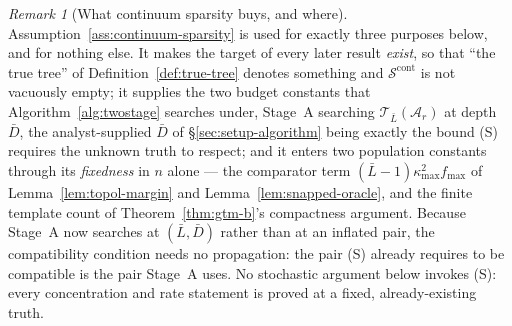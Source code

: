 \documentclass[11pt]{article}
\theoremstyle{plain}
\theoremstyle{definition}
\theoremstyle{remark}
\newtheorem{remark}[theorem]{Remark}
\newcommand{\cA}{\mathcal{A}}
\newcommand{\cT}{\mathcal{T}}
\newcommand{\cS}{\mathcal{S}}
\begin{document}
\begin{remark}[What continuum sparsity buys, and where]
\label{rem:sparsity-role}
Assumption~\ref{ass:continuum-sparsity} is used for exactly three purposes
below, and for nothing else. It makes the target of every later result
\emph{exist}, so that ``the true tree'' of Definition~\ref{def:true-tree}
denotes something and \(\cS^{\mathrm{cont}}\) is not vacuously empty; it
supplies the two budget constants that Algorithm~\ref{alg:twostage} searches
under, Stage~A searching \(\cT_{\bar L}(\cA_r)\) at depth \(\bar D\), the
analyst-supplied \(\bar D\) of \S\ref{sec:setup-algorithm} being exactly the
bound (S) requires the unknown truth to respect; and it enters two population
constants through its \emph{fixedness} in \(n\) alone --- the comparator term
\((\bar L-1)\kappa_{\max}^2f_{\max}\) of Lemma~\ref{lem:topol-margin} and
Lemma~\ref{lem:snapped-oracle}, and the finite template count of
Theorem~\ref{thm:gtm-b}'s compactness argument. Because Stage~A now searches
at \((\bar L,\bar D)\) rather than at an inflated pair, the compatibility
condition needs no propagation: the pair (S) already requires to be
compatible is the pair Stage~A uses. No stochastic
argument below invokes (S): every concentration and rate statement is proved
at a fixed, already-existing truth.
\end{remark}
\end{document}
